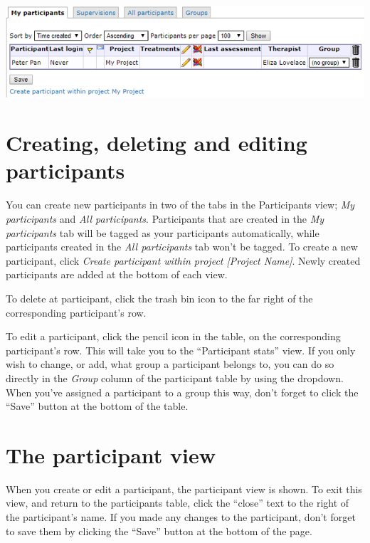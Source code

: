 \documentclass[]{book}
\begin{document}
\includegraphics{images/new-images/participantsTabs.png}

\hypertarget{creating-deleting-and-editing-participants}{%
\section{Creating, deleting and editing participants}\label{creating-deleting-and-editing-participants}}

You can create new participants in two of the tabs in the Participants view; \emph{My participants} and \emph{All participants}. Participants that are created in the \emph{My participants} tab will be tagged as your participants automatically, while participants created in the \emph{All participants} tab won't be tagged.
To create a new participant, click \emph{Create participant within project {[}Project Name{]}}. Newly created participants are added at the bottom of each view.

To delete at participant, click the trash bin icon to the far right of the corresponding participant's row.

To edit a participant, click the pencil icon in the table, on the corresponding participant's row. This will take you to the ``Participant stats'' view.
If you only wish to change, or add, what group a participant belongs to, you can do so directly in the \emph{Group} column of the participant table by using the dropdown. When you've assigned a participant to a group this way, don't forget to click the ``Save'' button at the bottom of the table.

\hypertarget{the-participant-view}{%
\section{The participant view}\label{the-participant-view}}

When you create or edit a participant, the participant view is shown. To exit this view, and return to the participants table, click the ``close'' text to the right of the participant's name. If you made any changes to the participant, don't forget to save them by clicking the ``Save'' button at the bottom of the page.
\end{document}
